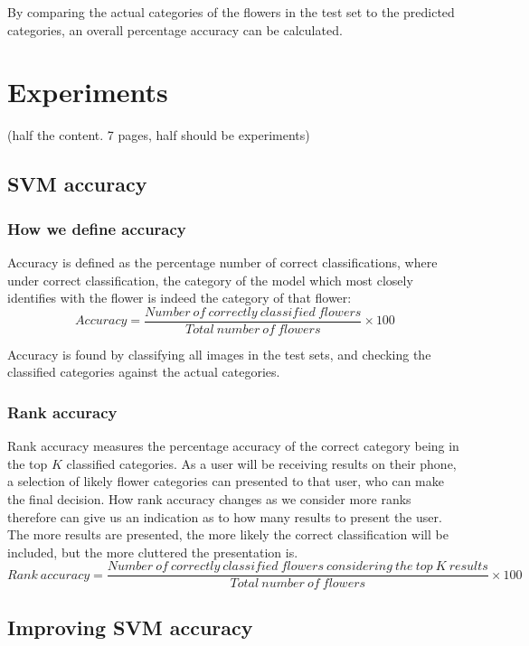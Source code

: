 \documentclass[11pt, a4paper]{report}
\begin{document}
By comparing the actual categories of the flowers in the test set to the predicted categories, an overall percentage accuracy can be calculated.


\section{Experiments}
(half the content. 7 pages, half should be experiments)

\subsection{SVM accuracy}

\subsubsection{How we define accuracy}

Accuracy is defined as the percentage number of correct classifications, where under correct classification, the category of the model which most closely identifies with the flower is indeed the category of that flower:
$$
Accuracy = \frac{Number\ of\ correctly\ classified\ flowers}{Total\ number\ of\ flowers}
\times 100
$$

Accuracy is found by classifying all images in the test sets, and checking the classified categories against the actual categories. 

\subsubsection{Rank accuracy}

Rank accuracy measures the percentage accuracy of the correct category being in the top $K$ classified categories. As a user will be receiving results on their phone, a selection of likely flower categories can presented to that user, who can make the final decision. How rank accuracy changes as we consider more ranks therefore can give us an indication as to how many results to present the user. The more results are presented, the more likely the correct classification will be included, but the more cluttered the presentation is.
$$
Rank\ accuracy = \frac{Number\ of\ correctly\ classified\ flowers\ considering\ the\ top\ K\ results}{Total\ number\ of\ flowers}
\times 100
$$



\subsection{Improving SVM accuracy}
\end{document}
